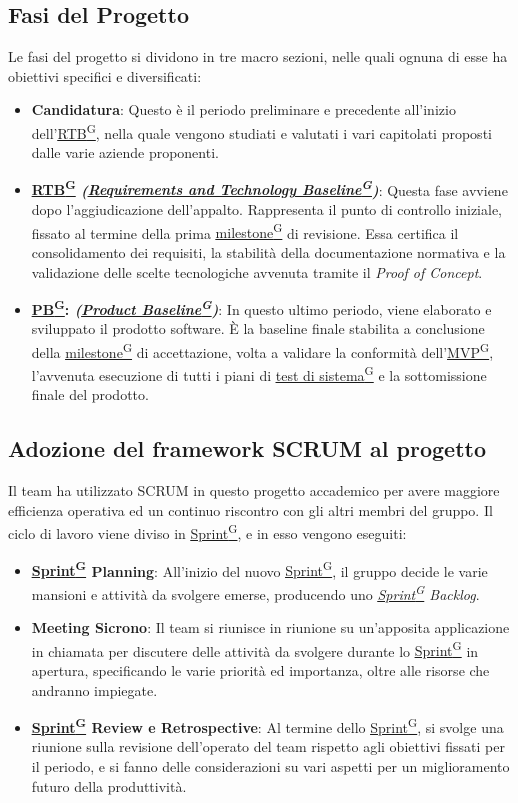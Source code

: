 \documentclass[a4paper,12pt]{article}
\providecommand{\glslink}[2]{\href{https://alittlebyte-19.github.io/Documentazione/glossario.html\#gls-#1}{\underline{#2}\textsuperscript{\scriptsize G}}}
\begin{document}
\subsection{Fasi del Progetto}
Le fasi del progetto si dividono in tre macro sezioni, nelle quali ognuna di esse ha obiettivi specifici e diversificati:
\begin{itemize}
    \item \textbf{Candidatura}: Questo è il periodo preliminare e precedente all'inizio dell'\glslink{rtb-requirements-and-technology-baseline}{RTB}, nella quale vengono studiati e valutati i vari
    capitolati proposti dalle varie aziende proponenti.
    \item \textbf{\glslink{rtb-requirements-and-technology-baseline}{RTB} \textit{(\glslink{rtb-requirements-and-technology-baseline}{Requirements and Technology Baseline})}}: Questa fase avviene dopo l'aggiudicazione dell'appalto. Rappresenta il punto di controllo iniziale, fissato al termine della prima \glslink{milestone}{milestone} di revisione. Essa certifica il consolidamento dei requisiti, la stabilità della documentazione normativa e la validazione delle scelte tecnologiche avvenuta tramite il \textit{Proof of Concept}.
    \item \textbf{\glslink{pb-product-baseline}{PB}: \textit{(\glslink{pb-product-baseline}{Product Baseline})}}: In questo ultimo periodo, viene elaborato e sviluppato il prodotto software. È la baseline finale stabilita a conclusione della \glslink{milestone}{milestone} di accettazione, volta a validare la conformità dell'\glslink{mvp-minimum-viable-product}{MVP}, l'avvenuta esecuzione di tutti i piani di \glslink{test-di-sistema}{test di sistema} e la sottomissione finale del prodotto.
\end{itemize}

\subsection{Adozione del framework SCRUM al progetto}
Il team ha utilizzato SCRUM in questo progetto accademico per avere maggiore efficienza operativa ed un continuo riscontro con gli altri membri del gruppo.
Il ciclo di lavoro viene diviso in \glslink{sprint}{Sprint}, e in esso vengono eseguiti:
\begin{itemize}
    \item \textbf{\glslink{sprint}{Sprint} Planning}: All'inizio del nuovo \glslink{sprint}{Sprint}, il gruppo decide le varie mansioni e attività da svolgere emerse, producendo uno \textit{\glslink{sprint}{Sprint} Backlog}.
    \item \textbf{Meeting Sicrono}: Il team si riunisce in riunione su un'apposita applicazione in chiamata per discutere delle attività da svolgere
    durante lo \glslink{sprint}{Sprint} in apertura, specificando le varie priorità ed importanza, oltre alle risorse che andranno impiegate.
    \item \textbf{\glslink{sprint}{Sprint} Review e Retrospective}: Al termine dello \glslink{sprint}{Sprint}, si svolge una riunione sulla revisione dell'operato del team rispetto agli obiettivi
    fissati per il periodo, e si fanno delle considerazioni su vari aspetti per un miglioramento futuro della produttività.
\end{itemize}
\end{document}
